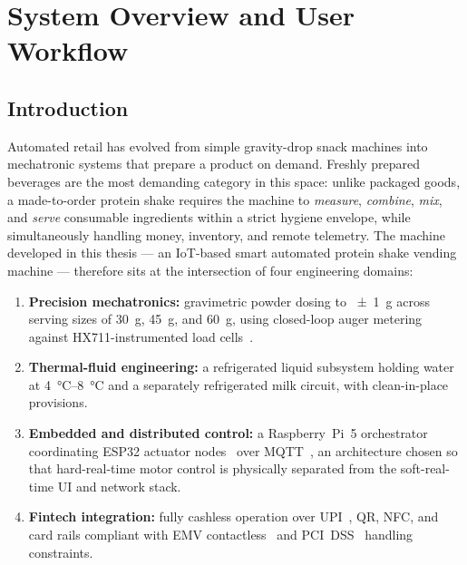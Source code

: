 \chapter{System Overview and User Workflow}
\label{ch:overview}

\section{Introduction}
\label{sec:intro}

Automated retail has evolved from simple gravity-drop snack machines into
mechatronic systems that prepare a product on demand. Freshly prepared
beverages are the most demanding category in this space: unlike packaged
goods, a made-to-order protein shake requires the machine to \emph{measure},
\emph{combine}, \emph{mix}, and \emph{serve} consumable ingredients within a
strict hygiene envelope, while simultaneously handling money, inventory, and
remote telemetry. The machine developed in this thesis --- an IoT-based smart
automated protein shake vending machine --- therefore sits at the
intersection of four engineering domains:

\begin{enumerate}[itemsep=2pt]
  \item \textbf{Precision mechatronics:} gravimetric powder dosing to
        \SI{\pm 1}{\gram} across serving sizes of \SI{30}{\gram},
        \SI{45}{\gram}, and \SI{60}{\gram}, using closed-loop auger
        metering against HX711-instrumented load cells~\cite{hx711datasheet}.
  \item \textbf{Thermal-fluid engineering:} a refrigerated liquid subsystem
        holding water at \SIrange{4}{8}{\celsius} and a separately
        refrigerated milk circuit, with clean-in-place provisions.
  \item \textbf{Embedded and distributed control:} a Raspberry~Pi~5
        orchestrator~\cite{rpi5brief} coordinating ESP32 actuator
        nodes~\cite{esp32datasheet} over MQTT~\cite{oasis2019mqtt}, an
        architecture chosen so that hard-real-time motor control is
        physically separated from the soft-real-time UI and network stack.
  \item \textbf{Fintech integration:} fully cashless operation over
        UPI~\cite{npci_upi}, QR, NFC, and card rails compliant with EMV
        contactless~\cite{emvco_contactless} and PCI~DSS~\cite{pcidss4}
        handling constraints.
\end{enumerate}

